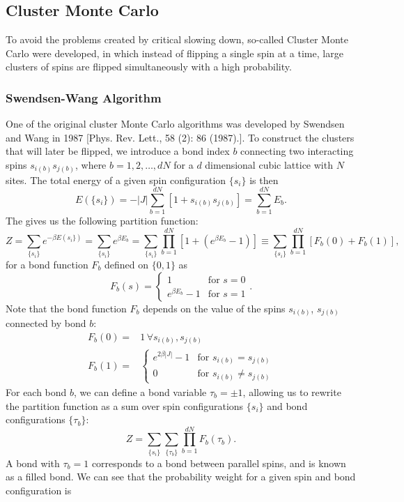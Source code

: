 \documentclass[11pt, oneside]{article}
\begin{document}
\subsection{Cluster Monte Carlo}
To avoid the problems created by critical slowing down, so-called Cluster Monte Carlo were developed, in which instead of flipping a single spin at a time, large clusters of spins are flipped simultaneously with a high probability.
\subsubsection{Swendsen-Wang Algorithm}
One of the original cluster Monte Carlo algorithms was developed by Swendsen and Wang in 1987 [Phys. Rev. Lett., 58 (2): 86 (1987).]. To construct the clusters that will later be flipped, we introduce a bond index $b$ connecting two interacting spins $s_{i(b)}s_{j(b)}$, where $b=1,2,\ldots,dN$ for a $d$ dimensional cubic lattice with $N$ sites. The total energy of a given spin configuration $\{s_i\}$ is then
$$E(\{s_i\})=-|J|\sum_{b=1}^{dN}[1+s_{i(b)}s_{j(b)}]=\sum_{b=1}^{dN}E_b.$$
The gives us the following partition function:
$$Z=\sum_{\{s_i\}}e^{-\beta E(s_i\})}=\sum_{\{s_i\}}e^{\beta E_b}=\sum_{\{s_i\}}\prod_{b=1}^{dN}[1+(e^{\beta E_b}-1)]\equiv\sum_{\{s_i\}}\prod_{b=1}^{dN}[F_b(0)+F_b(1)],$$
for a bond function $F_b$ defined on $\{0,1\}$ as
$$F_b(s)=\begin{cases}
1&\text{for $s=0$}\\
e^{\beta E_b}-1&\text{for $s=1$}
\end{cases}.$$
Note that the bond function $F_b$ depends on the value of the spins $s_{i(b)}$, $s_{j(b)}$ connected by bond $b$:
\begin{align*}
F_b(0)=&1\,\forall s_{i(b)}, s_{j(b)}\\
F_b(1)=&\begin{cases}
	e^{2\beta|J|}-1&\text{for $s_{i(b)}=s_{j(b)}$}\\
	0&\text{for $s_{i(b)}\neq s_{j(b)}$}
\end{cases}
\end{align*}
For each bond $b$, we can define a bond variable $\tau_b=\pm1$, allowing us to rewrite the partition function as a sum over spin configurations $\{s_i\}$ and bond configurations $\{\tau_b\}$:
$$Z=\sum_{\{s_i\}}\sum_{\{\tau_b\}}\prod_{b=1}^{dN}F_b(\tau_b).$$
A bond with $\tau_b=1$ corresponds to a bond between parallel spins, and is known as a filled bond. We can see that the probability weight for a given spin and bond configuration is
\end{document}
